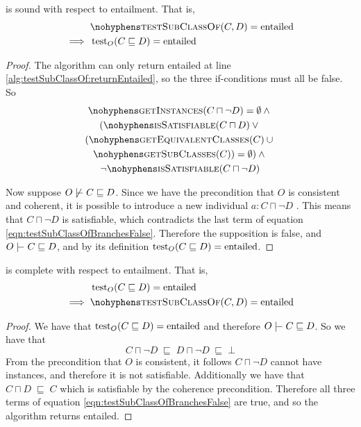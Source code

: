 \documentclass[paper.tex]{subfiles}
\begin{document}
\begin{lemma}
   is sound with respect to entailment.  That is,
  \begin{align*}
    & \textproc{testSubClassOf}(C, D) = \mathrm{entailed} \\
    \implies{}& \test_O(C \sqsubseteq D) = \mathrm{entailed}
  \end{align*}
\end{lemma}
\begin{proof}
  The algorithm can only return entailed at line \ref{alg:testSubClassOf:returnEntailed}, so the three if-conditions must all be false.  So
  \begin{multline}
    \label{eqn:testSubClassOfBranchesFalse}
    \textproc{getInstances}(C \sqcap \neg D) = \emptyset \land {} \\
    (\textproc{isSatisfiable}(C \sqcap D) \lor {} \\
    (\textproc{getEquivalentClasses}(C) \union {} \\
    \textproc{getSubClasses}(C)) = \emptyset) \land {} \\
    \lnot \textproc{isSatisfiable}(C \sqcap \neg D)
  \end{multline}

  Now suppose $O \not\sementails C \sqsubseteq D$.  Since we have the precondition that $O$ is consistent and coherent, it is possible to introduce a new individual $a : C \sqcap \neg D$ .  This means that $C \sqcap \neg D$ is satisfiable, which contradicts the last term of equation \ref{eqn:testSubClassOfBranchesFalse}.  Therefore the supposition is false, and $O \sementails C \sqsubseteq D$, and by its definition $\operatorname{test}_O(C \sqsubseteq D) = \mathrm{entailed}$.
\end{proof}

\begin{lemma}
   is complete with respect to entailment.  That is,
  \begin{align*}
    & \test_O(C \sqsubseteq D) = \mathrm{entailed} \\
    \implies{}& \textproc{testSubClassOf}(C, D) = \mathrm{entailed}
  \end{align*}
\end{lemma}
\begin{proof}
  We have that $\operatorname{test}_O(C \sqsubseteq D) = \mathrm{entailed}$ and therefore $O \sementails C \sqsubseteq D$.  So we have that
  \[ C \sqcap \neg D \;\sqsubseteq\; D \sqcap \neg D \;\sqsubseteq\; \bot \]
  From the precondition that $O$ is consistent, it follows $C \sqcap \neg D$ cannot have instances, and therefore it is not satisfiable.  Additionally we have that $C \sqcap D \;\sqsubseteq\; C$ which is satisfiable by the coherence precondition.  Therefore all three terms of equation \ref{eqn:testSubClassOfBranchesFalse} are true, and so the algorithm returns entailed.
\end{proof}
\end{document}

